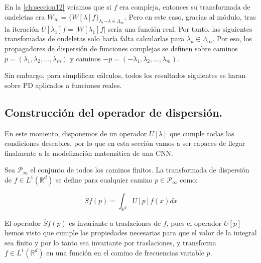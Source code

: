 \medskip

\noindent En la \autoref{ch:seccion12} veíamos que si $f$ era compleja, entonces su transformada de ondeletas era $ W_\infty=\lbrace W[\lambda]f \rbrace_{\lambda , -\lambda  \in \Lambda_{\infty} }$. Pero en este caso, gracias al módulo, tras la iteración $U[\lambda_1]f=\left|W[\lambda_1]f\right|$ sería una función real. Por tanto, las siguientes transfomadas de ondeletas solo haría falta calcularlas para $\lambda_k \in \Lambda_\infty$. Por eso, los propagadores de dispersión de funciones complejas se definen sobre caminos  $p=(\lambda_1,\lambda_2, \ldots , \lambda_m)$ y caminos  $-p=(-\lambda_1,\lambda_2, \ldots , \lambda_m)$.

\medskip

\noindent Sin embargo, para simplificar cálculos, todos los resultados siguientes se haran sobre PD aplicados a funciones reales.

\subsection{Construcción del operador de dispersión.}

\noindent En este momento, disponemos de un operador $U[\lambda]$ que cumple todas las condiciones deseables, por lo que en esta sección vamos a ser capaces de llegar finalmente a la modelización matemática de una CNN.

\begin{definicion} \label{def:S_barra}
Sea $\mathcal{P}_\infty$ el conjunto de todos los caminos finitos. La transformada de dispersión de $f \in L^1(\mathbb{R}^d)$ se define para cualquier camino $p \in \mathcal{P}_\infty$ como:

\begin{equation}
  \overline{S}f(p)=\int_{\mathbb{R}^d}U[p]f(x)dx 
\end{equation}

\end{definicion}

\medskip

\noindent El operador $\overline{S}f(p)$ es invariante a traslaciones de $f$, pues el operador $U[p]$ hemos visto que cumple las propiedades necesarias para que el valor de la integral sea finito y por lo tanto sea invariante por traslaciones, y transforma $f \in L^1(\mathbb{R}^d)$ en una función en el camino de frecuencias variable $p$.

\medskip


